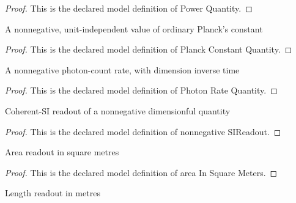 \begin{proof}
  This is the declared model definition of Power Quantity.
\end{proof}
\begin{definition}
  \label{def:physics:phyx-mini-0588:phyxminiproblems-problemphyxmini0588-planckconstantquantity}
  A nonnegative, unit-independent value of ordinary Planck's constant
\end{definition}
\begin{proof}
  This is the declared model definition of Planck Constant Quantity.
\end{proof}
\begin{definition}
  \label{def:physics:phyx-mini-0588:phyxminiproblems-problemphyxmini0588-photonratequantity}
  A nonnegative photon-count rate, with dimension inverse time
\end{definition}
\begin{proof}
  This is the declared model definition of Photon Rate Quantity.
\end{proof}
\begin{definition}
  \label{def:physics:phyx-mini-0588:phyxminiproblems-problemphyxmini0588-nonnegativesireadout}
  Coherent-SI readout of a nonnegative dimensionful quantity
\end{definition}
\begin{proof}
  This is the declared model definition of nonnegative SIReadout.
\end{proof}
\begin{definition}
  \label{def:physics:phyx-mini-0588:phyxminiproblems-problemphyxmini0588-areainsquaremeters}
  Area readout in square metres
\end{definition}
\begin{proof}
  This is the declared model definition of area In Square Meters.
\end{proof}
\begin{definition}
  \label{def:physics:phyx-mini-0588:phyxminiproblems-problemphyxmini0588-lengthinmeters}
  Length readout in metres
\end{definition}
